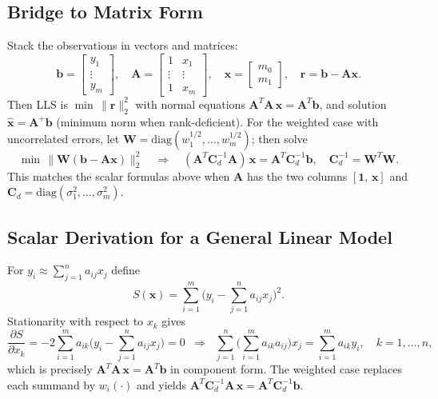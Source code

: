 \documentclass[11pt,a4paper]{article}
\begin{document}
\subsection{Bridge to Matrix Form}
Stack the observations in vectors and matrices:
\begin{equation}
  \mathbf{b}=\begin{bmatrix}y_1\\ \vdots \\ y_m\end{bmatrix},\quad
  \mathbf{A}=\begin{bmatrix}1 & x_1\\ \vdots & \vdots \\ 1 & x_m\end{bmatrix},\quad
  \mathbf{x}=\begin{bmatrix}m_0\\ m_1\end{bmatrix},\quad \mathbf{r}=\mathbf{b}-\mathbf{A}\mathbf{x}.
\end{equation}
Then LLS is $\min\,\|\mathbf{r}\|_2^2$ with normal equations $\mathbf{A}^T\mathbf{A}\,\mathbf{x}=\mathbf{A}^T\mathbf{b}$, and solution $\widehat{\mathbf{x}}=\mathbf{A}^+\mathbf{b}$ (minimum norm when rank-deficient). For the weighted case with uncorrelated errors, let $\mathbf{W}=\mathrm{diag}(w_1^{1/2},\dots,w_m^{1/2})$; then solve
\begin{equation}
  \min\,\|\mathbf{W}(\mathbf{b}-\mathbf{A}\mathbf{x})\|_2^2\quad\Rightarrow\quad
  (\mathbf{A}^T\mathbf{C}_d^{-1}\mathbf{A})\,\mathbf{x}=\mathbf{A}^T\mathbf{C}_d^{-1}\mathbf{b},\quad \mathbf{C}_d^{-1}=\mathbf{W}^T\mathbf{W}.
\end{equation}
This matches the scalar formulas above when $\mathbf{A}$ has the two columns $[\mathbf{1},\,\mathbf{x}]$ and $\mathbf{C}_d=\mathrm{diag}(\sigma_1^2,\dots,\sigma_m^2)$.

\subsection{Scalar Derivation for a General Linear Model}
For $y_i \approx \sum_{j=1}^n a_{ij} x_j$ define
\begin{equation}
  S(\mathbf{x}) = \sum_{i=1}^m \bigg(y_i - \sum_{j=1}^n a_{ij} x_j\bigg)^2.
\end{equation}
Stationarity with respect to $x_k$ gives
\begin{equation}
  \frac{\partial S}{\partial x_k} = -2\sum_{i=1}^m a_{ik}\bigg(y_i - \sum_{j=1}^n a_{ij} x_j\bigg)=0
  \;\;\Rightarrow\;\; \sum_{j=1}^n\Big(\sum_{i=1}^m a_{ik}a_{ij}\Big) x_j = \sum_{i=1}^m a_{ik}y_i,\quad k=1,\dots,n,
\end{equation}
which is precisely $\mathbf{A}^T\mathbf{A}\,\mathbf{x}=\mathbf{A}^T\mathbf{b}$ in component form. The weighted case replaces each summand by $w_i(\cdot)$ and yields $\mathbf{A}^T\mathbf{C}_d^{-1}\mathbf{A}\,\mathbf{x}=\mathbf{A}^T\mathbf{C}_d^{-1}\mathbf{b}$.
\end{document}
